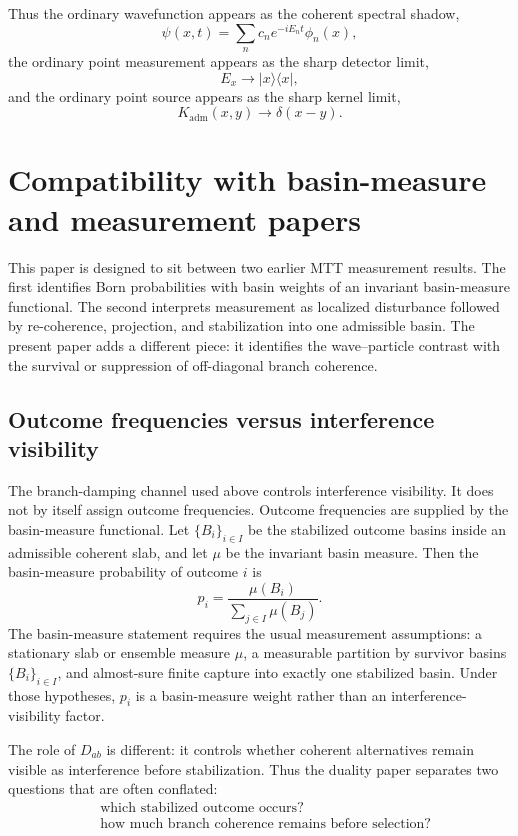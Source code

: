 \documentclass[11pt]{article}
\newcommand{\Kadm}{K_{\mathrm{adm}}}
\begin{document}
Thus the ordinary wavefunction appears as the coherent spectral shadow,
\[
  \psi(x,t)=\sum_n c_ne^{-iE_nt}\phi_n(x),
\]
the ordinary point measurement appears as the sharp detector limit,
\[
  E_x\to |x\rangle\langle x|,
\]
and the ordinary point source appears as the sharp kernel limit,
\[
  \Kadm(x,y)\to\delta(x-y).
\]

\section{Compatibility with basin-measure and measurement papers}

This paper is designed to sit between two earlier MTT measurement results. The first
identifies Born probabilities with basin weights of an invariant basin-measure functional.
The second interprets measurement as localized disturbance followed by re-coherence,
projection, and stabilization into one admissible basin. The present paper adds a different
piece: it identifies the wave--particle contrast with the survival or suppression of
off-diagonal branch coherence.

\subsection{Outcome frequencies versus interference visibility}

The branch-damping channel used above controls interference visibility. It does not by
itself assign outcome frequencies. Outcome frequencies are supplied by the basin-measure
functional. Let \(\{B_i\}_{i\in I}\) be the stabilized outcome basins inside an admissible
coherent slab, and let \(\mu\) be the invariant basin measure. Then the basin-measure
probability of outcome \(i\) is
\[
  p_i
  =
  \frac{\mu(B_i)}{\sum_{j\in I}\mu(B_j)}.
\]
The basin-measure statement requires the usual measurement assumptions: a stationary
slab or ensemble measure \(\mu\), a measurable partition by survivor basins
\(\{B_i\}_{i\in I}\), and almost-sure finite capture into exactly one stabilized basin. Under
those hypotheses, \(p_i\) is a basin-measure weight rather than an interference-visibility
factor.

The role of \(D_{ab}\) is different: it controls whether coherent alternatives remain
visible as interference before stabilization. Thus the duality paper separates two questions
that are often conflated:
\[
\begin{aligned}
  &\text{which stabilized outcome occurs?}\\
  &\text{how much branch coherence remains before selection?}
\end{aligned}
\]
\end{document}

